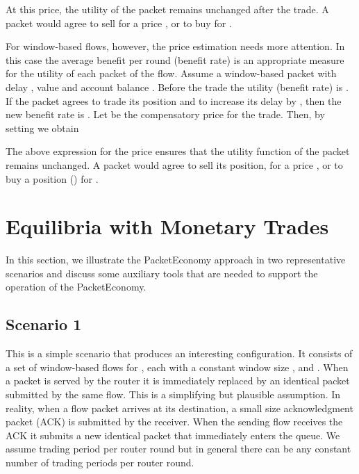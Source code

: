 \documentclass[letterpaper,10pt]{llncs}
\begin{document}
At this price, the utility of the packet remains unchanged after the trade.
A packet would agree to sell for a price , or to buy for .

For window-based flows, however, the price estimation needs more attention.
In this case the average benefit per round (benefit rate) is an appropriate measure 
for the utility of each packet of the flow. 
Assume a window-based packet  with delay , 
value  and account balance .
Before the trade the utility (benefit rate) is . 
If the packet agrees to
trade its position and to increase its delay by , then
the new benefit rate is . 
Let  be the compensatory price for the trade. Then, by setting  we obtain



\noindent The above expression for the price ensures that the utility function
of the packet remains unchanged.
A packet would agree to sell its position, for a price , or to buy a
position () for . 

\section{Equilibria with Monetary Trades}
\label{sec:scenarios}

\newcommand{\allKN}[1]{\forall #1 \in \mathbb{N}}
\newcommand{\allKX}[2]{\forall #1 \in \{1 \ldots #2 \}}
\newcommand{\allKXS}[3]{\forall #1 \in \{#2 \ldots #3 \}}

In this section, we illustrate the PacketEconomy approach in two representative scenarios
and discuss some auxiliary tools that are needed to support the operation of the PacketEconomy.

\subsection{Scenario 1}
\label{sec:ScenarioNoFiat}
This is a simple scenario that produces an interesting configuration.
It consists of a set of  window-based flows  for ,
each with a constant window size , and .
When a packet is served by the router it is immediately replaced by an identical packet
submitted by the same flow. This is a simplifying but plausible assumption. In reality,
when a flow packet arrives at its destination, a small size acknowledgment packet (ACK) 
is submitted by the receiver. When the sending flow receives the ACK it submits a new
identical packet that immediately enters the queue.
We assume  trading period 
per router round but in general there can be any constant number of trading periods per router 
round.
\end{document}
